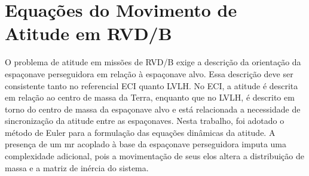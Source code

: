 \section{Equações do Movimento de Atitude em RVD/B}
\label{sec:equacoes_movimento_atitude}

O problema de atitude em missões de RVD/B exige a descrição da orientação da espaçonave perseguidora em relação à espaçonave alvo.
Essa descrição deve ser consistente tanto no referencial ECI quanto LVLH.
No ECI, a atitude é descrita em relação ao centro de massa da Terra, enquanto que no LVLH, é descrito em torno do centro de massa da espaçonave alvo e está relacionada a necessidade de sincronização da atitude entre as espaçonaves.
Nesta trabalho, foi adotado o método de Euler para a formulação das equações dinâmicas da atitude.
A presença de um \gls{mr} acoplado à base da espaçonave perseguidora imputa uma complexidade adicional, pois a movimentação de seus elos altera a distribuição de massa e a matriz de inércia do sistema.







